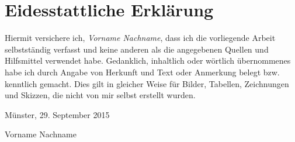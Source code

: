 \chapter*{Eidesstattliche Erklärung}

Hiermit versichere ich, \textit{Vorname Nachname}, dass ich die vorliegende Arbeit selbstständig verfasst und keine anderen als die angegebenen Quellen und Hilfsmittel verwendet habe. Gedanklich, inhaltlich oder wörtlich übernommenes habe ich durch Angabe von Herkunft und Text oder Anmerkung belegt bzw. kenntlich gemacht. Dies gilt in gleicher Weise für Bilder, Tabellen, Zeichnungen und Skizzen, die nicht von mir selbst erstellt wurden.


\par
\vspace*{10ex}

\begin{minipage}[b][][t]{0.5\textwidth}
	Münster, 29. September 2015
\end{minipage}
\hfill
\begin{minipage}[b][][b]{0.5\textwidth}
	\hrulefill
\end{minipage}

\par
\vspace*{-2ex}
\hfill
\begin{minipage}{0.5\textwidth}
	\centering
	Vorname Nachname
\end{minipage}